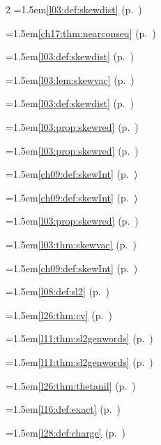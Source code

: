 \begin{multicols}{2}
\hangindent=1.5em\quad \ref{l03:def:skewdist} (p.~\pageref{l03:def:skewdist})\par
\hangindent=1.5em\quad \ref{ch17:thm:nearconseq} (p.~\pageref{ch17:thm:nearconseq})\par
\hangindent=1.5em\quad \ref{l03:def:skewdist} (p.~\pageref{l03:def:skewdist})\par
\hangindent=1.5em\quad \ref{l03:lem:skewvac} (p.~\pageref{l03:lem:skewvac})\par
\hangindent=1.5em\quad \ref{l03:def:skewdist} (p.~\pageref{l03:def:skewdist})\par
\hangindent=1.5em\quad \ref{l03:prop:skewred} (p.~\pageref{l03:prop:skewred})\par
\hangindent=1.5em\quad \ref{l03:prop:skewred} (p.~\pageref{l03:prop:skewred})\par
\hangindent=1.5em\quad \ref{ch09:def:skewInt} (p.~\pageref{ch09:def:skewInt})\par
\hangindent=1.5em\quad \ref{ch09:def:skewInt} (p.~\pageref{ch09:def:skewInt})\par
\hangindent=1.5em\quad \ref{l03:prop:skewred} (p.~\pageref{l03:prop:skewred})\par
\hangindent=1.5em\quad \ref{l03:thm:skewvac} (p.~\pageref{l03:thm:skewvac})\par
\hangindent=1.5em\quad \ref{ch09:def:skewInt} (p.~\pageref{ch09:def:skewInt})\par
\hangindent=1.5em\quad \ref{l08:def:sl2} (p.~\pageref{l08:def:sl2})\par
\hangindent=1.5em\quad \ref{l26:thm:cv} (p.~\pageref{l26:thm:cv})\par
\hangindent=1.5em\quad \ref{l11:thm:sl2genwords} (p.~\pageref{l11:thm:sl2genwords})\par
\hangindent=1.5em\quad \ref{l11:thm:sl2genwords} (p.~\pageref{l11:thm:sl2genwords})\par
\hangindent=1.5em\quad \ref{l26:thm:thetanil} (p.~\pageref{l26:thm:thetanil})\par
\hangindent=1.5em\quad \ref{l16:def:exact} (p.~\pageref{l16:def:exact})\par
\hangindent=1.5em\quad \ref{l28:def:charge} (p.~\pageref{l28:def:charge})\par

\end{multicols}
